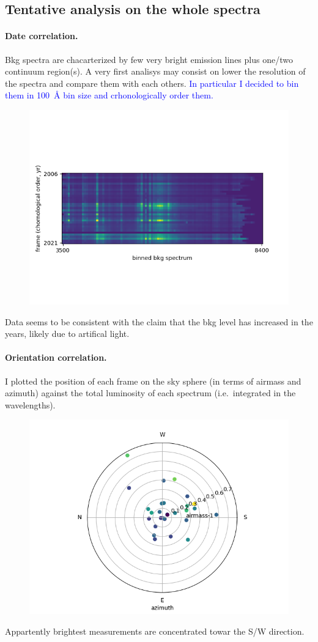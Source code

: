 \documentclass{article}
\newcommand{\arbitrario}[1]{\textcolor{blue}{#1}}
\begin{document}
\subsection{Tentative analysis on the whole spectra}

\paragraph{Date correlation.}
Bkg spectra are chacarterized by few very bright emission lines plus one/two continuum region(s). A very first analisys may consist on lower the resolution of the spectra and compare them with each others. \arbitrario{In particular I decided to bin them in \SI{100}{\angstrom} bin size and crhonologically order them.}
\begin{figure}[h!]
	\centering
	\includegraphics[width=.75\textwidth]{../Figure_1}
\end{figure}
Data seems to be consistent with the claim that the bkg level has increased in the years, likely due to artifical light.

\paragraph{Orientation correlation.} I plotted the position of each frame on the sky sphere (in terms of airmass and azimuth) against the total luminosity of each spectrum (i.e.\ integrated in the wavelengths).
\begin{figure}[h!]
	\centering
	\includegraphics[width=.75\textwidth]{../radial}
\end{figure}
Appartently brightest measurements are concentrated towar the S/W direction.
\end{document}
